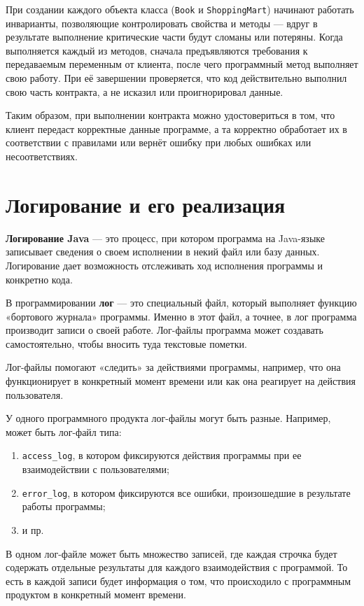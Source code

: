 При создании каждого объекта класса (\verb|Book| и \verb|ShoppingMart|) начинают работать инварианты, позволяющие контролировать свойства и методы — вдруг в результате выполнение критические части будут сломаны или потеряны. Когда выполняется каждый из методов, сначала предъявляются требования к передаваемым переменным от клиента, после чего программный метод выполняет свою работу. При её завершении проверяется, что код действительно выполнил свою часть контракта, а не исказил или проигнорировал данные.

Таким образом, при выполнении контракта можно удостовериться в том, что клиент передаст корректные данные программе, а та корректно обработает их в соответствии с правилами или вернёт ошибку при любых ошибках или несоответствиях.

\section{Логирование и его реализация}

\textbf{Логирование Java} — это процесс, при котором программа на Java-языке записывает сведения о своем исполнении в некий файл или базу данных. Логирование дает возможность отслеживать ход исполнения программы и конкретно кода.

В программировании \textbf{лог} — это специальный файл, который выполняет функцию «бортового журнала» программы. Именно в этот файл, а точнее, в лог программа производит записи о своей работе. Лог-файлы программа может создавать самостоятельно, чтобы вносить туда текстовые пометки.

Лог-файлы помогают «следить» за действиями программы, например, что она функционирует в конкретный момент времени или как она реагирует на действия пользователя.

У одного программного продукта лог-файлы могут быть разные. Например, может быть лог-файл типа:

\begin{enumerate}
    \item \verb|access_log|, в котором фиксируются действия программы при ее взаимодействии с пользователями;
    \item \verb|error_log|, в котором фиксируются все ошибки, произошедшие в результате работы программы;
    \item и пр.
\end{enumerate}

В одном лог-файле может быть множество записей, где каждая строчка будет содержать отдельные результаты для каждого взаимодействия с программой. То есть в каждой записи будет информация о том, что происходило с программным продуктом в конкретный момент времени.

